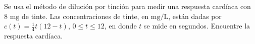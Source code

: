 \item Se usa el método de dilución por tinción para medir una respuesta cardíaca con $8 \text{ mg}$ de tinte. Las concentraciones de tinte, en $\text{mg/L}$, están dadas por $c(t) = \frac{1}{4}t(12 - t)$, $0 \le t \le 12$, en donde $t$ se mide en segundos. Encuentre la respuesta cardíaca.
